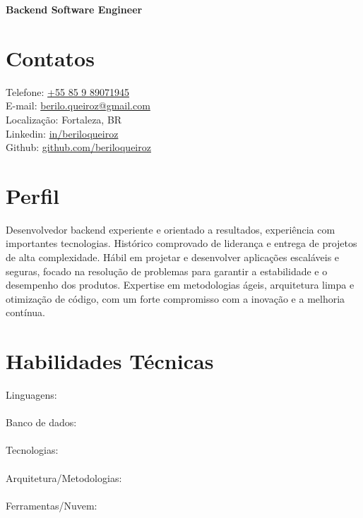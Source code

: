 \documentclass[11pt,a4paper,sans]{moderncv}
\begin{document}
\makecvtitle
\vspace*{-16mm}
\begin{center}\textbf{ Backend Software Engineer}\end{center}

\section{Contatos}
 {
  \begin{samepage}
	  \faMobile\enspace Telefone: {\color{blue}\href{tel:+5585989071945}{+55 85 9 89071945}} \\
	  \faEnvelope\enspace E-mail: {\color{blue}\href{mailto:berilo.queiroz@gmail.com}{berilo.queiroz@gmail.com}} \\
	  \faHome\enspace Localização: Fortaleza, BR \\
	  \faLinkedin\enspace Linkedin: {\color{blue}\href{https://www.linkedin.com/in/beriloqueiroz}{in/beriloqueiroz}}\\
	  \faGithub\enspace Github: {\color{blue} \href{https://github.com/beriloqueiroz}{github.com/beriloqueiroz}}
  \end{samepage}
 }
\section{Perfil}
 {
  Desenvolvedor backend experiente e orientado a resultados, experiência com importantes tecnologias.
  Histórico comprovado de liderança e entrega de projetos de alta complexidade. Hábil
  em projetar e desenvolver aplicações escaláveis e seguras, focado na resolução de problemas para garantir
  a estabilidade e o desempenho dos produtos. Expertise em metodologias ágeis, arquitetura limpa e
  otimização de código, com um forte compromisso com a inovação e a melhoria contínua.
 }

\section{Habilidades Técnicas}
 {
  Linguagens:      
    \\
  \\
  Banco de dados:    \\
  \\
  Tecnologias:    \\
  \\
  Arquitetura/Metodologias:      \\
  \\
  Ferramentas/Nuvem:    \\
  \\
 }
\end{document}
